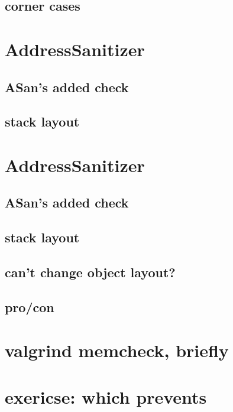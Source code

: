 \subsection{corner cases}


\section{AddressSanitizer}


\subsection{ASan's added check}


\subsection{stack layout}




\section{AddressSanitizer}


\subsection{ASan's added check}


\subsection{stack layout}


\subsection{can't change object layout?}


\subsection{pro/con}


\section{valgrind memcheck, briefly}


\section{exericse: which prevents}

